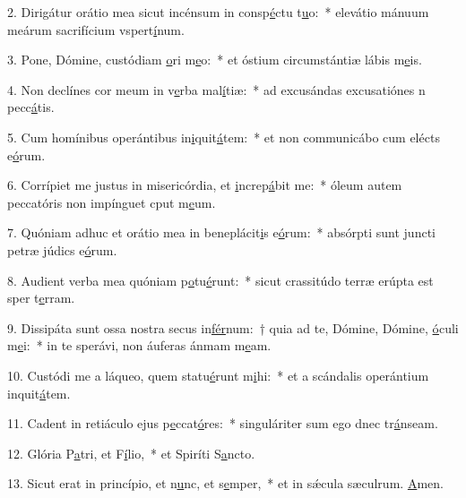 2. Dirigátur orátio mea sicut incénsum in consp\uline{é}ctu t\uline{u}o:~* elevátio mánuum meárum sacrifícium vspert\uline{í}num.\par 
3. Pone, Dómine, custódiam \uline{o}ri m\uline{e}o:~* et óstium circumstántiæ lábis m\uline{e}is.\par 
4. Non declínes cor meum in v\uline{e}rba mal\uline{í}tiæ:~* ad excusándas excusatiónes n pecc\uline{á}tis.\par 
5. Cum homínibus operántibus in\uline{i}quit\uline{á}tem:~* et non communicábo cum elécts e\uline{ó}rum.\par 
6. Corrípiet me justus in misericórdia, et \uline{i}ncrep\uline{á}bit me:~* óleum autem peccatóris non impínguet cput m\uline{e}um.\par 
7. Quóniam adhuc et orátio mea in beneplácit\uline{i}s e\uline{ó}rum:~* absórpti sunt juncti petræ júdics e\uline{ó}rum.\par 
8. Audient verba mea quóniam p\uline{o}tu\uline{é}runt:~* sicut crassitúdo terræ erúpta est sper t\uline{e}rram.\par 
9. Dissipáta sunt ossa nostra secus in\uline{fér}num:~† quia ad te, Dómine, Dómine, \uline{ó}culi m\uline{e}i:~* in te sperávi, non áuferas ánmam m\uline{e}am.\par 
10. Custódi me a láqueo, quem statu\uline{é}runt m\uline{i}hi:~* et a scándalis operántium inquit\uline{á}tem.\par 
11. Cadent in retiáculo ejus p\uline{e}ccat\uline{ó}res:~* singuláriter sum ego dnec tr\uline{á}nseam.\par 
12. Glória P\uline{a}tri, et F\uline{í}lio,~* et Spiríti S\uline{a}ncto.\par 
13. Sicut erat in princípio, et n\uline{u}nc, et s\uline{e}mper,~* et in sǽcula sæculrum. \uline{A}men.\par 
